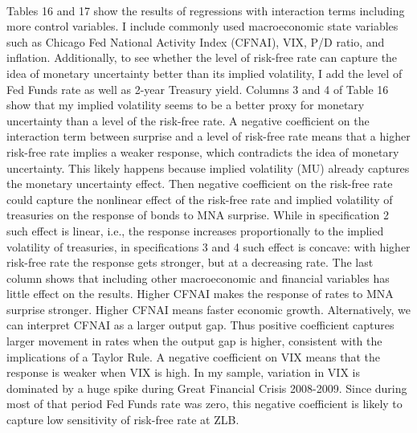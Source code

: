 \documentclass[12pt]{article}
\begin{document}
\paragraph{}
Tables 16 and 17 show the results of regressions with interaction terms including more control variables. I include commonly used macroeconomic state variables such as Chicago Fed National Activity Index (CFNAI), VIX, P/D ratio, and inflation. Additionally, to see whether the level of risk-free rate can capture the idea of monetary uncertainty better than its implied volatility, I add the level of Fed Funds rate as well as 2-year Treasury yield. Columns 3 and 4 of Table 16 show that my implied volatility seems to be a better proxy for monetary uncertainty than a level of the risk-free rate. A negative coefficient on the interaction term between surprise and a level of risk-free rate means that a higher risk-free rate implies a weaker response, which contradicts the idea of monetary uncertainty. This likely happens because implied volatility (MU) already captures the monetary uncertainty effect. Then negative coefficient on the risk-free rate could capture the nonlinear effect of the risk-free rate and implied volatility of treasuries on the response of bonds to MNA surprise. While in specification 2 such effect is linear, i.e., the response increases proportionally to the implied volatility of treasuries, in specifications 3 and 4 such effect is concave: with higher risk-free rate the response gets stronger, but at a decreasing rate. The last column shows that including other macroeconomic and financial variables has little effect on the results. Higher CFNAI makes the response of rates to MNA surprise stronger. Higher CFNAI means faster economic growth. Alternatively, we can interpret CFNAI as a larger output gap. Thus positive coefficient captures larger movement in rates when the output gap is higher, consistent with the implications of a Taylor Rule. A negative coefficient on VIX means that the response is weaker when VIX is high. In my sample, variation in VIX is dominated by a huge spike during Great Financial Crisis 2008-2009. Since during most of that period Fed Funds rate was zero, this negative coefficient is likely to capture low sensitivity of risk-free rate at ZLB.
\end{document}
